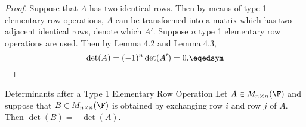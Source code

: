 \documentclass[linearalgebra]{subfiles}
\begin{document}
    \begin{proof}
        Suppose that $A$ has two identical rows. Then by means of type 1 elementary row operations, $A$ can be transformed into a matrix which has two adjacent identical rows, denote which $A'$. Suppose $n$ type 1 elementary row operations are used. Then by Lemma 4.2 and Lemma 4.3,
        \begin{equation*}
            \det(A) = (-1)^n \det (A') = 0. \eqedsym
        \end{equation*}
    \end{proof}

    \clearpage
    \begin{prop}{Determinants after a Type 1 Elementary Row Operation}
        Let $A\in M_{n\times n}(\F)$ and suppose that $B\in M_{n\times n}(\F)$ is obtained by exchanging row $i$ and row $j$ of $A$. Then $\det(B) = -\det(A)$.
    \end{prop}
\end{document}
